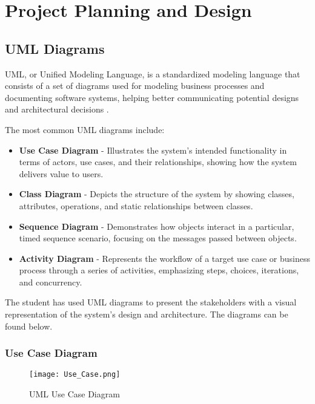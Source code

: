 \chapter{Project Planning and Design}

\section{UML Diagrams}

UML, or Unified Modeling Language, is a standardized modeling language that consists of a set of diagrams used for modeling business processes and documenting software systems, helping better communicating potential designs and architectural decisions \parencite{uml}. 

The most common UML diagrams include:
\begin{itemize}
    \item \textbf{Use Case Diagram} - Illustrates the system's intended functionality in terms of actors, use cases, and their relationships, showing how the system delivers value to users.
    \item \textbf{Class Diagram} - Depicts the structure of the system by showing classes, attributes, operations, and static relationships between classes.
    \item \textbf{Sequence Diagram} - Demonstrates how objects interact in a particular, timed sequence scenario, focusing on the messages passed between objects.
    \item \textbf{Activity Diagram} - Represents the workflow of a target use case or business process through a series of activities, emphasizing steps, choices, iterations, and concurrency.
\end{itemize}

The student has used UML diagrams to present the stakeholders with a visual representation of the system's design and architecture. The diagrams can be found below.

\subsection{Use Case Diagram}

\begin{figure}[ht]
    \centering
    \texttt{[image: Use\_Case.png]}
    \caption{UML Use Case Diagram}
    \label{fig:uml_usecase}
\end{figure}

\FloatBarrier
\clearpage

